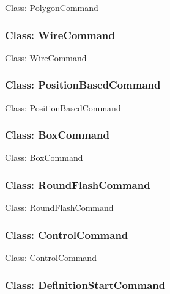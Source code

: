\documentclass[11pt,twoside,openany,x11names,svgnames]{memoir}
\begin{document}
Class: PolygonCommand

\subsubsection{Class: WireCommand}\label{Class-WireCommand}

Class: WireCommand

\subsubsection{Class: PositionBasedCommand}\label{Class-PositionBasedCommand}

Class: PositionBasedCommand

\subsubsection{Class: BoxCommand}\label{Class-BoxCommand}

Class: BoxCommand

\subsubsection{Class: RoundFlashCommand}\label{Class-RoundFlashCommand}

Class: RoundFlashCommand

\subsubsection{Class: ControlCommand}\label{Class-ControlCommand}

Class: ControlCommand

\subsubsection{Class: DefinitionStartCommand}\label{Class-DefinitionStartCommand}
\end{document}
